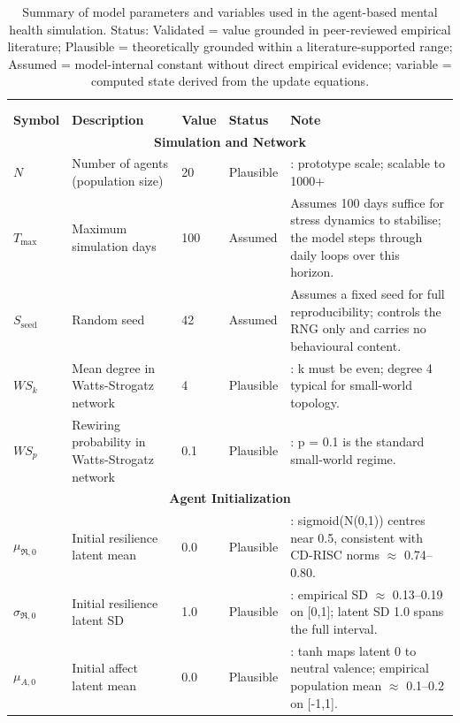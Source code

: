 \documentclass[
  letterpaper,
  DIV=11,
  numbers=noendperiod]{scrartcl}
\begin{document}
\begin{longtable}{lp{2.4cm}p{1.6cm}p{1.7cm}p{5.2cm}}

\caption{\label{tbl-parameters}Summary of model parameters and variables used in the agent-based mental health simulation. Status: Validated = value grounded in peer-reviewed empirical literature; Plausible = theoretically grounded within a literature-supported range; Assumed = model-internal constant without direct empirical evidence; variable = computed state derived from the update equations.}

\tabularnewline

 \\
 \\
\toprule
\textbf{Symbol} & \textbf{Description} & \textbf{Value} & \textbf{Status} & \textbf{Note} \\
\midrule
\multicolumn{5}{c}{\textbf{Simulation and Network}} \\
\midrule
$N$ & Number of agents (population size) & 20 & Plausible & \cite{watts1998}: prototype scale; scalable to 1000+ \\
$T_{\max}$ & Maximum simulation days & 100 & Assumed & Assumes 100 days suffice for stress dynamics to stabilise; the model steps through daily loops over this horizon. \\
$S_{\mathrm{seed}}$ & Random seed & 42 & Assumed & Assumes a fixed seed for full reproducibility; controls the RNG only and carries no behavioural content. \\
$WS_k$ & Mean degree in Watts-Strogatz network & 4 & Plausible & \cite{watts1998}: k must be even; degree 4 typical for small-world topology. \\
$WS_p$ & Rewiring probability in Watts-Strogatz network & 0.1 & Plausible & \cite{watts1998}: p = 0.1 is the standard small-world regime. \\
\midrule
\multicolumn{5}{c}{\textbf{Agent Initialization}} \\
\midrule
$\mu_{\mathfrak{R},0}$ & Initial resilience latent mean & 0.0 & Plausible & \cite{shively2020}: sigmoid(N(0,1)) centres near 0.5, consistent with CD-RISC norms $\approx$ 0.74--0.80. \\
$\sigma_{\mathfrak{R},0}$ & Initial resilience latent SD & 1.0 & Plausible & \cite{connor2003}: empirical SD $\approx$ 0.13--0.19 on [0,1]; latent SD 1.0 spans the full interval. \\
$\mu_{A,0}$ & Initial affect latent mean & 0.0 & Plausible & \cite{watson1988}: tanh maps latent 0 to neutral valence; empirical population mean $\approx$ 0.1--0.2 on [-1,1]. \\

\end{longtable}
\end{document}
